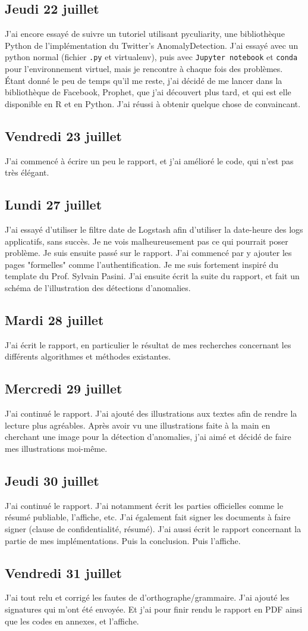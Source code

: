 \documentclass[paper=a4, fontsize=11pt]{scrartcl}
\begin{document}
\subsection{Jeudi 22 juillet}
    J'ai encore essayé de suivre un tutoriel utilisant pyculiarity, une bibliothèque Python de l'implémentation du Twitter's AnomalyDetection. J'ai essayé avec un python normal (fichier \verb,.py, et virtualenv), puis avec \verb,Jupyter notebook, et \verb,conda, pour l'environnement virtuel, mais je rencontre à chaque fois des problèmes. Étant donné le peu de temps qu'il me reste, j'ai décidé de me lancer dans la bibliothèque de Facebook, Prophet, que j'ai découvert plus tard, et qui est elle disponible en R et en Python. J'ai réussi à obtenir quelque chose de convaincant.
\subsection{Vendredi 23 juillet}
    J'ai commencé à écrire un peu le rapport, et j'ai amélioré le code, qui n'est pas très élégant.
\subsection{Lundi 27 juillet}
    J'ai essayé d'utiliser le filtre \og date \fg de Logstash afin d'utiliser la date-heure des logs applicatifs, sans succès. Je ne vois malheureusement pas ce qui pourrait poser problème. Je suis ensuite passé sur le rapport. J'ai commencé par y ajouter les pages "formelles" comme l'authentification. Je me suis fortement inspiré du template du Prof. Sylvain Pasini. J'ai ensuite écrit la suite du rapport, et fait un schéma de l'illustration des détections d'anomalies.
\subsection{Mardi 28 juillet}
    J'ai écrit le rapport, en particulier le résultat de mes recherches concernant les différents algorithmes et méthodes existantes.
\subsection{Mercredi 29 juillet}
    J'ai continué le rapport. J'ai ajouté des illustrations aux textes afin de rendre la lecture plus agréables. Après avoir vu une illustrations faite à la main en cherchant une image pour la détection d'anomalies, j'ai aimé et décidé de faire mes illustrations moi-même.
\subsection{Jeudi 30 juillet}
    J'ai continué le rapport. J'ai notamment écrit les parties officielles comme le résumé publiable, l'affiche, etc. J'ai également fait signer les documents à faire signer (clause de confidentialité, résumé). J'ai aussi écrit le rapport concernant la partie de mes implémentations. Puis la conclusion. Puis l'affiche.
\subsection{Vendredi 31 juillet}
    J'ai tout relu et corrigé les fautes de d'orthographe/grammaire. J'ai ajouté les signatures qui m'ont été envoyée. Et j'ai pour finir rendu le rapport en PDF ainsi que les codes en annexes, et l'affiche.
    
\end{document}
